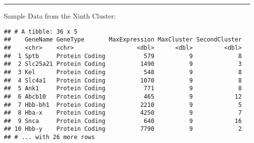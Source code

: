 \documentclass[
]{book}
\begin{document}
\begin{center}\rule{0.5\linewidth}{0.5pt}\end{center}

Sample Data from the Ninth Cluster:

\begin{verbatim}
## # A tibble: 36 x 5
##    GeneName GeneType       MaxExpression MaxCluster SecondCluster
##    <chr>    <chr>                  <dbl>      <dbl>         <dbl>
##  1 Sptb     Protein Coding           579          9             8
##  2 Slc25a21 Protein Coding          1490          9             3
##  3 Kel      Protein Coding           548          9             8
##  4 Slc4a1   Protein Coding          1070          9             8
##  5 Ank1     Protein Coding           771          9             8
##  6 Abcb10   Protein Coding           465          9            12
##  7 Hbb-bh1  Protein Coding          2210          9             5
##  8 Hba-x    Protein Coding          4250          9             7
##  9 Snca     Protein Coding           640          9            16
## 10 Hbb-y    Protein Coding          7790          9             2
## # ... with 26 more rows
\end{verbatim}

  
\end{document}
